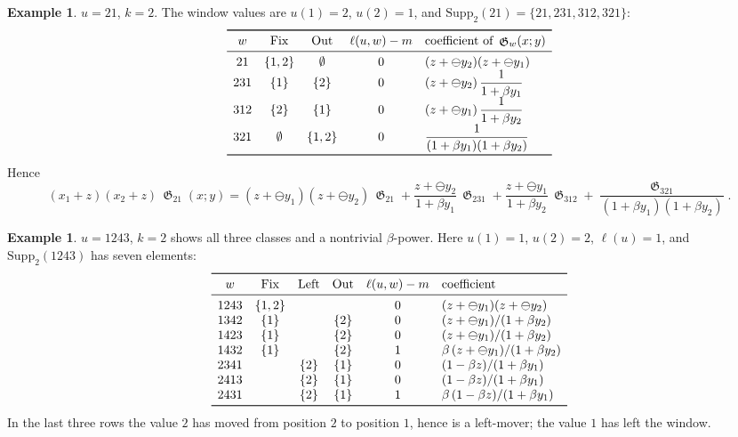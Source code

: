 \documentclass{amsart}
\theoremstyle{definition}
\newtheorem{example}[theorem]{Example}
\theoremstyle{remark}
\DeclareMathOperator{\groth}{\mathfrak{G}}
\newcommand{\fgn}{\ominus}
\newcommand{\Fix}{\mathrm{Fix}}
\newcommand{\Lft}{\mathrm{Left}}
\newcommand{\Out}{\mathrm{Out}}
\newcommand{\Supp}{\mathrm{Supp}}
\begin{document}
\begin{example}\label{ex:top21}
$u=21$, $k=2$. The window values are $u(1)=2$, $u(2)=1$, and $\Supp_2(21)=\{21,231,312,321\}$:
\[
\begin{array}{c c c c l}
\toprule
w & \Fix & \Out & \ell(u,w)-m & \text{coefficient of } \groth_w(x;y) \\
\midrule
21  & \{1,2\} & \emptyset & 0 & (z+\fgn y_2)(z+\fgn y_1) \\
231 & \{1\}   & \{2\}     & 0 & (z+\fgn y_2)\,\dfrac{1}{1+\beta y_1} \\
312 & \{2\}   & \{1\}     & 0 & (z+\fgn y_1)\,\dfrac{1}{1+\beta y_2} \\
321 & \emptyset & \{1,2\} & 0 & \dfrac{1}{(1+\beta y_1)(1+\beta y_2)} \\
\bottomrule
\end{array}
\]
Hence
\[
(x_1+z)(x_2+z)\,\groth_{21}(x;y)
= (z+\fgn y_1)(z+\fgn y_2)\,\groth_{21}
+ \frac{z+\fgn y_2}{1+\beta y_1}\,\groth_{231}
+ \frac{z+\fgn y_1}{1+\beta y_2}\,\groth_{312}
+ \frac{\groth_{321}}{(1+\beta y_1)(1+\beta y_2)}.
\]
\end{example}

\begin{example}\label{ex:top1243}
$u=1243$, $k=2$ shows all three classes and a nontrivial $\beta$-power. Here $u(1)=1$,
$u(2)=2$, $\ell(u)=1$, and $\Supp_2(1243)$ has seven elements:
\[
\begin{array}{c c c c c l}
\toprule
w & \Fix & \Lft & \Out & \ell(u,w)-m & \text{coefficient} \\
\midrule
1243 & \{1,2\} & & & 0 & (z+\fgn y_1)(z+\fgn y_2) \\
1342 & \{1\} & & \{2\} & 0 & (z+\fgn y_1)/(1+\beta y_2) \\
1423 & \{1\} & & \{2\} & 0 & (z+\fgn y_1)/(1+\beta y_2) \\
1432 & \{1\} & & \{2\} & 1 & \beta\,(z+\fgn y_1)/(1+\beta y_2) \\
2341 & & \{2\} & \{1\} & 0 & (1-\beta z)/(1+\beta y_1) \\
2413 & & \{2\} & \{1\} & 0 & (1-\beta z)/(1+\beta y_1) \\
2431 & & \{2\} & \{1\} & 1 & \beta\,(1-\beta z)/(1+\beta y_1) \\
\bottomrule
\end{array}
\]
In the last three rows the value $2$ has moved from position $2$ to position $1$, hence is a
left-mover; the value $1$ has left the window.
\end{example}
\end{document}
